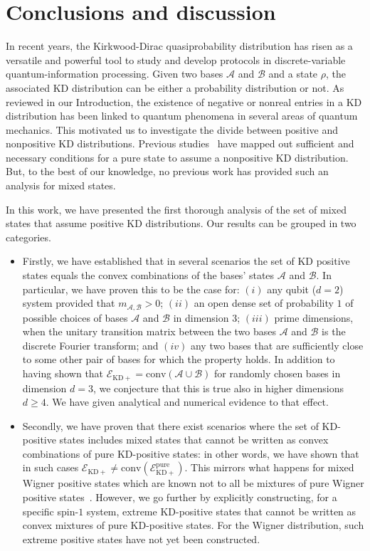\documentclass[a4paper, notitlepage, 11pt]{article}
\numberwithin{equation}{section}
\newcommand{\Acal}{{\mathcal A}}
\newcommand{\Bcal}{{\mathcal B}}
\newcommand{\EcalKDC}{{\mathcal E}_{\mathrm{KD+}}}
\newcommand{\EcalKDCpu}{{\mathcal E}_{\mathrm{KD+}}^{\mathrm{pure}}}
\newcommand{\mab}{m_{\Acal,\Bcal}}
\newcommand{\conv}[1]{\mathrm{conv}\left(#1\right)}
\newcommand{\convAB}{\conv{\Acal \cup \Bcal}}
\begin{document}
\section{Conclusions and discussion}\label{s:conc}

In recent years, the Kirkwood-Dirac quasiprobability distribution has risen as a versatile and powerful tool to study and develop protocols in discrete-variable quantum-information processing. Given two bases $\mathcal{A}$ and $\mathcal{B}$ and a state $\rho$, the associated KD distribution can be either a probability distribution or not. As reviewed in our Introduction, the existence of negative or nonreal entries in a KD distribution has been linked to quantum phenomena in several areas of quantum mechanics. This motivated us to investigate the divide between positive and nonpositive KD distributions. Previous studies~\cite{arvidsson-shukuretal2021, debievre2021, debievre2023a} have mapped out sufficient and necessary conditions for a pure state to assume a nonpositive KD distribution. But, to the best of our knowledge, no previous work has provided such an analysis for mixed states. 

In this work, we have presented the first thorough analysis of the set of mixed states that assume positive KD distributions. Our results can be grouped in two categories. 

\begin{itemize}
  \item Firstly, we have established that in several scenarios the set of KD positive states equals the convex combinations of the bases’ states $\mathcal{A}$ and $\mathcal{B}$. In particular, we have proven this to be the case for: $(i)$ any qubit ($d=2$) system provided  that $\mab >0$; $(ii)$ an open dense set of probability $1$ of possible choices of bases $\Acal$ and $\Bcal$ in dimension $3$; $(iii)$ prime dimensions, when the unitary transition matrix between the two bases $\Acal$ and $\Bcal$ is the discrete Fourier transform; and $(iv)$ any two bases that are sufficiently close to some other pair of bases for which the property holds. In addition to having shown that $\EcalKDC = \convAB$ for randomly chosen bases in dimension $d=3$, we conjecture that this is true also in higher dimensions $d\geq 4$.  We have given analytical and numerical evidence to that effect.   
  
  \item Secondly, we have proven that there exist scenarios where the set of KD-positive states includes mixed states that cannot be written as convex combinations of pure KD-positive states: in other words, we have shown that in such cases $\EcalKDC \neq \conv{\EcalKDCpu}$. This mirrors what happens for mixed Wigner positive states which are known not to all be mixtures of pure Wigner positive states~\cite{genonietal2013,vanherstraetencerf2021, hertzdebievre2023}. However, we go further by explicitly constructing, for a specific spin-$1$ system, extreme KD-positive states that cannot be written as convex mixtures of pure KD-positive states. For the Wigner distribution, such extreme positive states have not yet been constructed.   
\end{itemize}
\end{document}
